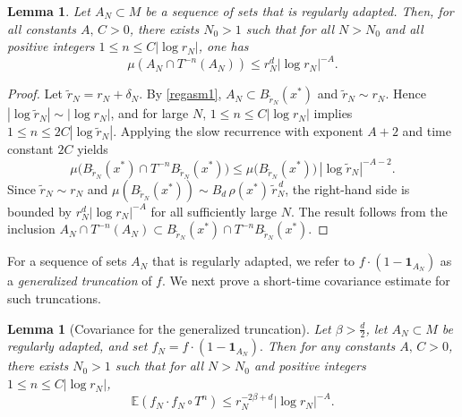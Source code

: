 \documentclass[11pt,twoside,a4paper,reqno]{amsart}
\newtheorem{lemma}[theorem]{Lemma}
\newcommand{\E}{\mathbb{E}}
\def\one{{\mathbf{1}}}
\begin{document}
\begin{lemma}\label{slowrecanlem}
Let $A_N\subset M$ be a sequence of sets that is regularly adapted. Then, for all constants $A,\,C>0$, there exists $N_0>1$ such that for all $N>N_0$ and all positive integers $1\le n\le C|\log r_N|$, one has
\begin{equation*}
\mu \left(A_N \cap T^{-n}(A_N) \right) \leq r_N^d |\log r_N|^{-A}.
\end{equation*}
\end{lemma}


\begin{proof}
Let $\widetilde r_N = r_N + \delta_N$. By \eqref{regasm1}, $A_N \subset B_{\widetilde r_N}(x^*)$ and $\widetilde r_N \sim r_N$. Hence $|\log \widetilde r_N| \sim |\log r_N|$, and for large $N$, $1\le n \le C|\log r_N|$ implies $1\le n \le 2C|\log \widetilde r_N|$. Applying the slow recurrence with exponent $A+2$ and time constant $2C$ yields
$$
\mu\bigl(B_{\widetilde r_N}(x^*) \cap T^{-n}B_{\widetilde r_N}(x^*)\bigr)
\le \mu\bigl(B_{\widetilde r_N}(x^*)\bigr)\,|\log \widetilde r_N|^{-A-2}.
$$
Since $\widetilde r_N \sim r_N$ and $\mu(B_{\widetilde r_N}(x^*)) \sim B_d\,\rho(x^*)\,\widetilde r_N^{\,d}$, the right-hand side is bounded by $r_N^d|\log r_N|^{-A}$ for all sufficiently large $N$. The result follows from the inclusion $A_N \cap T^{-n}(A_N) \subset B_{\widetilde r_N}(x^*) \cap T^{-n}B_{\widetilde r_N}(x^*)$.
\end{proof}

For a sequence of sets $A_N$ that is regularly adapted, we refer to $f\cdot(1-\one_{A_N})$ as a \emph{generalized truncation} of $f$. We next prove a short-time covariance estimate for such truncations.





\begin{lemma}[Covariance for the generalized truncation]\label{truncvarlem}
Let $\beta>\frac{d}{2}$, let $A_N \subset M$ be regularly adapted, and set $f_N=f \cdot \left(1-\one_{A_N}\right).$ Then for any constants $A,\,C>0$, there exists $N_0>1$ such that for all $N>N_0$ and positive integers $1\leq n\leq C |\log r_N|$,
\begin{equation}\label{truncvarlemconc}
\E\left(f_N \cdot f_N\circ T^n\right) \leq r_N^{- 2\beta + d} |\log r_N|^{-A}.
\end{equation}
\end{lemma}
\end{document}
